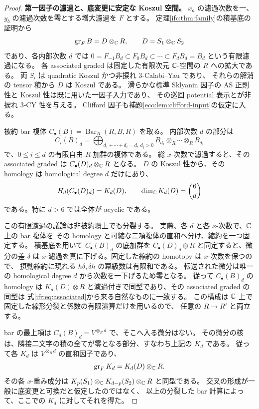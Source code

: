 \begin{proof}
\textbf{第一因子の濾過と、底変更に安定な Koszul 空間。}
$x_a$ の濾過次数を一、$y_b$ の濾過次数を零とする増大濾過を $F$ とする。
定理\ref{ifc:thm:family}の積基底の証明から
\begin{equation}\label{ifr:eq:associated}
 \operatorname{gr}_F B=D\otimes_\mathbb C R,
 \qquad D=S_1\otimes_\mathbb C S_2
\end{equation}
であり、各内部次数 $d$ では $0=F_{-1}B_d\subset F_0B_d
\subset\cdots\subset F_dB_d=B_d$ という有限濾過になる。
各 associated graded は固定した有限次元 $\mathbb C$-空間の $R$ への拡大である。
両 $S_i$ は quadratic Koszul かつ非捩れ $3$-Calabi--Yau であり、
それらの解消の tensor 積から $D$ は Koszul である。
滑らかな標準 Sklyanin 因子の AS 正則性と Koszul 性は既に用いた一因子入力であり、
その巡回 potential 表示と\cite[Corollary~2.9]{MoriSmith}が非捩れ $3$-CY 性を与える。
Clifford 因子も補題\ref{eco:lem:clifford-input}の仮定に入る。

被約 bar 複体 $C_\bullet(B)=\operatorname{Bar}_R(R,B,R)$ を取る。
内部次数 $d$ の部分は
\[
 C_i(B)_d=
  \bigoplus_{d_1+\cdots+d_i=d,\ d_j>0}
          B_{d_1}\otimes_R\cdots\otimes_RB_{d_i}
\]
で、$0\le i\le d$ の有限自由 $R$-加群の複体である。
総 $x$-次数で濾過すると、その associated graded は
$C_\bullet(D)_d\otimes_\mathbb C R$ となる。
$D$ の Koszul 性から、その homology は homological degree $d$ だけにあり、
\[
 H_d(C_\bullet(D)_d)=K_d(D),\qquad
 \dim_\mathbb C K_d(D)=\binom6d
\]
である。特に $d>6$ では全体が acyclic である。

この有限濾過の議論は非被約環上でも分裂する。
実際、各 $d$ と各 $x$-次数で、$\mathbb C$ 上の bar 複体を
その homology と可縮な二項複体の直和へ分け、縮約を一つ固定する。
積基底を用いて $C_\bullet(B)_d$ の底加群を
$C_\bullet(D)_d\otimes R$ と同定すると、微分の差 $\delta$ は
$x$-濾過を真に下げる。固定した縮約の homotopy は $x$-次数を保つので、
摂動縮約に現れる $h\delta,\delta h$ の冪級数は有限和である。
転送された微分は唯一の homological degree $d$ から次数を一下げるため零となる。
従って $C_\bullet(B)_d$ の homology は
$K_d(D)\otimes R$ と濾過付きで同型であり、その associated graded の同型は
式\eqref{ifr:eq:associated}から来る自然なものに一致する。
この構成は $\mathbb C$ 上で固定した線形分裂と係数の有限演算だけを用いるので、
任意の $R\to R'$ と両立する。

bar の最上項は $C_d(B)_d=V^{\otimes_Rd}$ で、そこへ入る微分はない。
その微分の核は、隣接二文字の積の全てが零となる部分、すなわち上記の $K_d$ である。
従って各 $K_d$ は $V^{\otimes_Rd}$ の直和因子であり、
\begin{equation}\label{ifr:eq:k-associated}
  \operatorname{gr}_F K_d=K_d(D)\otimes_\mathbb C R.
\end{equation}
その各 $x$-重み成分は
$K_p(S_1)\otimes_\mathbb C K_{d-p}(S_2)\otimes_\mathbb C R$ と同型である。
交叉の形成が一般に底変更と可換だと仮定したのではなく、
以上の分裂した bar 計算によって、ここでの $K_d$ に対してそれを得た。


\end{proof}
